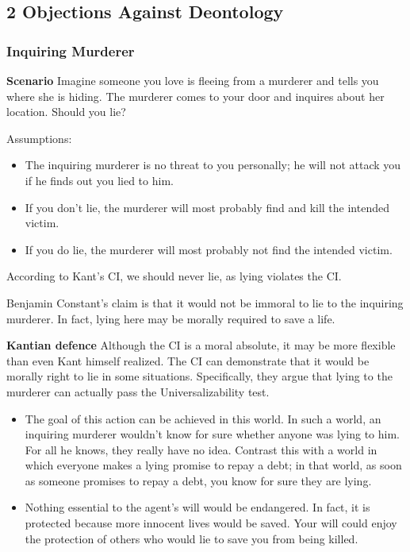 \documentclass[12pt]{article}
\begin{document}
\subsection{2 Objections Against Deontology}
\subsubsection{Inquiring Murderer}
\textbf{Scenario} Imagine someone you love is fleeing from a murderer and tells you where she is hiding. The murderer comes to your door and inquires about her location. Should you lie?

\noindent Assumptions:
\begin{itemize}
    \item The inquiring murderer is no threat to you personally; he will not attack you if he finds out you lied to him.
    \item If you don’t lie, the murderer will most probably find and kill the intended victim.
    \item If you do lie, the murderer will most probably not find the intended victim.
\end{itemize}

\noindent According to Kant's CI, we should never lie, as lying violates the CI.

\noindent Benjamin Constant's claim is that it would not be immoral to lie to the inquiring murderer. In fact, lying here may be morally required
to save a life.

\noindent\textbf{Kantian defence} Although the CI is a moral absolute,
it may be more flexible than even Kant himself realized.
The CI can demonstrate that it would be morally right to lie in some situations.
Specifically, they argue that lying to the murderer can actually pass the Universalizability test.
\begin{itemize}
    \item The goal of this action can be achieved in this world. 
    In such a world, an inquiring murderer wouldn’t know for sure whether anyone was lying to him. 
    For all he knows, they really have no idea. 
    Contrast this with a world in which everyone makes a lying promise to repay a debt; in that world, as soon as someone promises to repay a debt, you know for sure they are lying.
    \item Nothing essential to the agent’s will would be endangered. 
    In fact, it is protected because more innocent lives would be saved. 
    Your will could enjoy the protection of others who would lie to save you from being killed.
\end{itemize}
\end{document}

